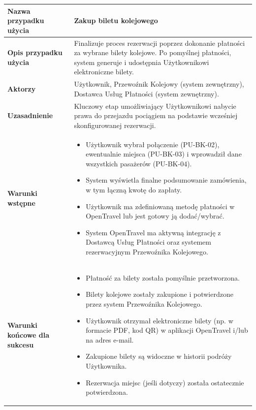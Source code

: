 \documentclass[a4paper,12pt]{article}
\begin{document}
\begin{longtable}{|p{\pierwszakolumnaszerokoscPUBKZakup}|p{\drugakolumnaszerokoscPUBKZakup}|}
    \textbf{Nazwa przypadku użycia} & Zakup biletu kolejowego \\
    \hline
    \textbf{Opis przypadku użycia} & Finalizuje proces rezerwacji poprzez dokonanie płatności za wybrane bilety kolejowe. Po pomyślnej płatności, system generuje i udostępnia Użytkownikowi elektroniczne bilety. \\
    \hline
    \textbf{Aktorzy} & Użytkownik, Przewoźnik Kolejowy (system zewnętrzny), Dostawca Usług Płatności (system zewnętrzny). \\
    \hline
    \textbf{Uzasadnienie} & Kluczowy etap umożliwiający Użytkownikowi nabycie prawa do przejazdu pociągiem na podstawie wcześniej skonfigurowanej rezerwacji. \\
    \hline
    \textbf{Warunki wstępne} &
        \begin{itemize} \itemsep0pt \parskip0pt \parsep0pt
            \item Użytkownik wybrał połączenie (PU-BK-02), ewentualnie miejsca (PU-BK-03) i wprowadził dane wszystkich pasażerów (PU-BK-04).
            \item System wyświetla finalne podsumowanie zamówienia, w tym łączną kwotę do zapłaty.
            \item Użytkownik ma zdefiniowaną metodę płatności w OpenTravel lub jest gotowy ją dodać/wybrać.
            \item System OpenTravel ma aktywną integrację z Dostawcą Usług Płatności oraz systemem rezerwacyjnym Przewoźnika Kolejowego.
        \end{itemize} \\
    \hline
    \textbf{Warunki końcowe dla sukcesu} &
        \begin{itemize} \itemsep0pt \parskip0pt \parsep0pt
            \item Płatność za bilety została pomyślnie przetworzona.
            \item Bilety kolejowe zostały zakupione i potwierdzone przez system Przewoźnika Kolejowego.
            \item Użytkownik otrzymał elektroniczne bilety (np. w formacie PDF, kod QR) w aplikacji OpenTravel i/lub na adres e-mail.
            \item Zakupione bilety są widoczne w historii podróży Użytkownika.
            \item Rezerwacja miejsc (jeśli dotyczy) została ostatecznie potwierdzona.
        \end{itemize} \\
    \hline

\end{longtable}
\end{document}
